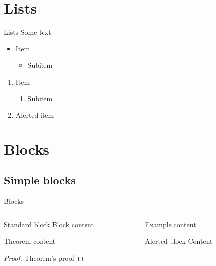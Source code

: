 {
    \frame{\titlepage}
}

\section{Lists}
\begin{frame}{Lists}
    Some text
    \begin{itemize}
        \item Item
        \begin{itemize}
            \item Subitem
        \end{itemize}
    \end{itemize}
    \begin{enumerate}
        \item Item
        \begin{enumerate}
            \item Subitem
        \end{enumerate}
        \item \alert{Alerted item}
    \end{enumerate}
\end{frame}

\section{Blocks}
\subsection{Simple blocks}
\begin{frame}{Blocks}
    \begin{columns}
        \begin{column}{0.5\linewidth}
            \begin{block}{Standard block}
                Block content
            \end{block}
            \begin{theorem}
                Theorem content
            \end{theorem}
            \begin{proof}
                Theorem's proof
            \end{proof}
        \end{column}
        \begin{column}{0.5\linewidth}
            \begin{example}
                Example content
            \end{example}
            \begin{alertblock}{Alerted block}
                Content
            \end{alertblock}
        \end{column}
    \end{columns}
\end{frame}

